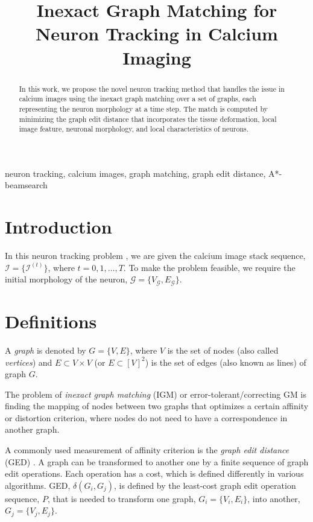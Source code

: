 \documentclass{article}
\title{Inexact Graph Matching for Neuron Tracking in Calcium Imaging}
\begin{document}
%
\maketitle
%
\begin{abstract}
In this work, we propose the novel neuron tracking method that handles the issue in calcium images using the inexact graph matching over a set of graphs, each representing the neuron morphology at a time step. The match is computed by minimizing the graph edit distance that incorporates the tissue deformation, local image feature, neuronal morphology, and local characteristics of neurons.
\end{abstract}
%
\begin{keywords}
neuron tracking, calcium images, graph matching, graph edit distance, A*-beamsearch
\end{keywords}
%
\section{Introduction}
\label{sec:intro}


In this neuron tracking problem \cite{Gulyanon2018a}, we are given the calcium image stack sequence, $\mathcal{I} = \{ \mathcal{I}^{(t)} \}$, where $t = 0,1,\dots,T$. To make the problem feasible, we require the initial morphology of the neuron, $\mathcal{G} = \{ V_\mathcal{G}, E_\mathcal{G} \}$.

\section{Definitions}
A \emph{graph} is denoted by $G = \{V, E\}$, where $V$ is the set of nodes (also called \emph{vertices}) and $E \subset V \times V$ (or $E \subset [V]^2$) is the set of edges (also known as lines) of graph $G$. 

The problem of \emph{inexact graph matching} (IGM) or error-tolerant/correcting GM is finding the mapping of nodes between two graphs that optimizes a certain affinity or distortion criterion, where nodes do not need to have a correspondence in another graph.

A commonly used measurement of affinity criterion is the \emph{graph edit distance} (GED) \cite{gao2010}. A graph can be transformed to another one by a finite sequence of graph edit operations. Each operation has a cost, which is defined differently in various algorithms. GED, $\delta (G_i, G_j)$, is defined by the least-cost graph edit operation sequence, $P$, that is needed to transform one graph, $G_i = \{V_i, E_i\}$, into another, $G_j = \{V_j, E_j\}$.
\end{document}
